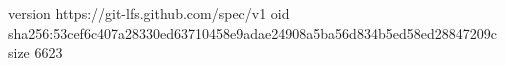 version https://git-lfs.github.com/spec/v1
oid sha256:53cef6c407a28330ed63710458e9adae24908a5ba56d834b5ed58ed28847209c
size 6623
